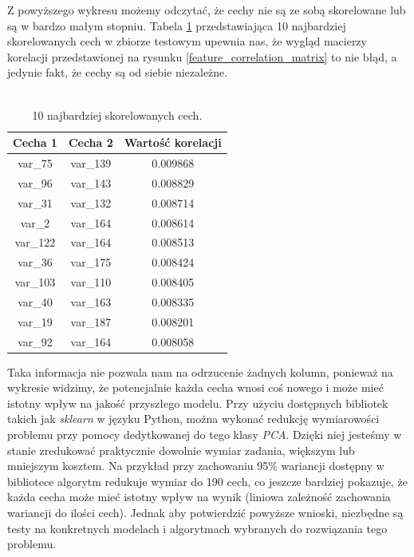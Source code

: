 \documentclass[12pt]{article}
\begin{document}
Z powyższego wykresu możemy odczytać, że cechy nie są ze sobą skorelowane lub są w bardzo małym stopniu. Tabela \ref{corr_table} przedstawiająca 10 najbardziej skorelowanych cech w zbiorze testowym upewnia nas, że wygląd macierzy korelacji przedstawionej na rysunku \ref{feature_correlation_matrix} to nie błąd, a jedynie fakt, że cechy są od siebie niezależne. \\
\\
\begin{table}[H]
\centering
\begin{tabular}{|c|c|c|}
 \hline
 Cecha 1  & Cecha 2  &        Wartość korelacji \\
    \hline
     \hline
var\_75 & var\_139 &  0.009868 \\
 \hline
var\_96 & var\_143 &  0.008829 \\
 \hline
var\_31 & var\_132 &  0.008714 \\
 \hline
var\_2 & var\_164 &  0.008614 \\
 \hline
var\_122 & var\_164 &  0.008513 \\
 \hline
var\_36 & var\_175 &  0.008424 \\
 \hline
var\_103 & var\_110 &  0.008405 \\
 \hline
var\_40 & var\_163 &  0.008335 \\
 \hline
var\_19 & var\_187 &  0.008201 \\
 \hline
var\_92 & var\_164 &  0.008058 \\
 \hline
\end{tabular}
\caption{10 najbardziej skorelowanych cech.}
\label{corr_table}
\end{table}

Taka informacja nie pozwala nam na odrzucenie żadnych kolumn, ponieważ na wykresie widzimy, że potencjalnie każda cecha wnosi coś nowego i może mieć istotny wpływ na jakość przyszłego modelu.
\newline
Przy użyciu dostępnych bibliotek takich jak \textit{sklearn} w języku Python, można wykonać redukcję wymiarowości problemu przy pomocy dedytkowanej do tego klasy \textit{PCA}. Dzięki niej jesteśmy w stanie zredukować praktycznie dowolnie wymiar zadania, większym lub mniejszym kosztem.
Na przykład przy zachowaniu 95\% wariancji dostępny w bibliotece algorytm redukuje wymiar do 190 cech, co jeszcze bardziej pokazuje, że każda cecha może mieć istotny wpływ na wynik (liniowa zależność zachowania wariancji do ilości cech). Jednak aby potwierdzić powyższe wnioski, niezbędne są testy na konkretnych modelach i algorytmach wybranych do rozwiązania tego problemu.
\end{document}
